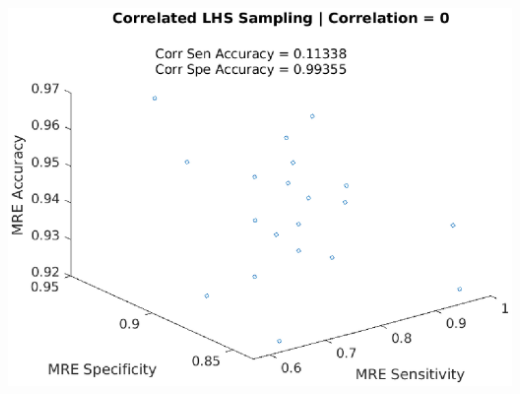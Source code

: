 \documentclass[aspectratio=1610]{beamer}
\begin{document}
\begin{frame}
\includegraphics[scale = .3]{mrecorr6}
\end{frame}
\end{document}
